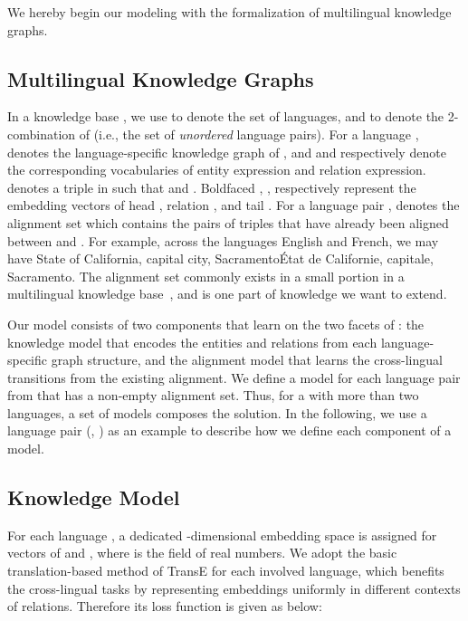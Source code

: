 \documentclass{article}
\def\inv{\vspace{-0.1cm}}
\begin{document}
We hereby begin our modeling with the formalization of multilingual knowledge graphs.

\inv
\subsection{Multilingual Knowledge Graphs}

In a knowledge base , we use  to denote the set of languages, and  to denote the 2-combination of  (i.e., the set of \emph{unordered} language pairs). For a language ,  denotes the language-specific knowledge graph of , and  and  respectively denote the corresponding vocabularies of entity expression and relation expression.
 denotes a triple in  such that  and . Boldfaced , ,  respectively represent the embedding vectors of head , relation , and tail . For a language pair ,  denotes the alignment set which contains
the pairs of triples that have already been aligned
between  and .
For example, across the languages English and French, we may have State of California, capital city, Sacramento\'{E}tat de Californie, capitale, Sacramento.
The alignment set commonly exists in a small portion in a multilingual knowledge base~\cite{vrandevcic2012wikidata,mahdisoltani2014yago3,lehmann2015dbpedia}, and is one part of knowledge we want to extend.
\par



Our model consists of two components that learn on the two facets of : the knowledge model that encodes the entities and relations from each language-specific graph structure, and the alignment model that learns the cross-lingual transitions from the existing alignment. We define a model for each language pair from  that has a non-empty alignment set. Thus, for a  with more than two languages, a set of models composes the solution. In the following, we use a language pair (, )  as an example to describe how we define each component of a model.
\par





\inv
\subsection{Knowledge Model}
For each language , a dedicated -dimensional embedding space  is assigned for vectors of  and , where  is the field of real numbers. We adopt the basic translation-based method of TransE
for each involved language, which benefits the cross-lingual tasks by representing embeddings uniformly in different contexts of relations.
Therefore its loss function is given as below:
\end{document}
